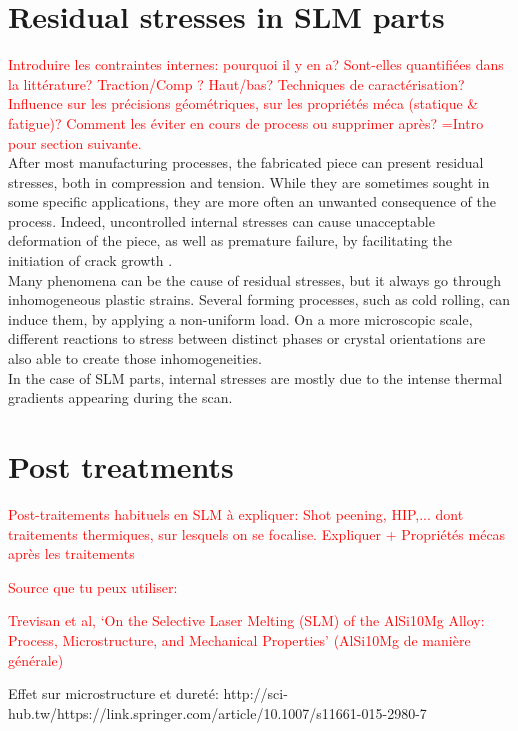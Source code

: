 \section{Residual stresses in SLM parts}
\textcolor{red}{Introduire les contraintes internes: pourquoi il y en a? Sont-elles quantifiées dans la littérature? Traction/Comp ? Haut/bas? Techniques de caractérisation? Influence sur les précisions géométriques, sur les propriétés méca (statique \& fatigue)? Comment les éviter en cours de process ou supprimer après? =Intro pour section suivante.}\\

After most manufacturing processes, the fabricated piece can present residual stresses, both in compression and tension. While they are sometimes sought in some specific applications, they are more often an unwanted consequence of the process. Indeed, uncontrolled internal stresses can cause unacceptable deformation of the piece, as well as premature failure, by facilitating the initiation of crack growth \cite{Vrancken2016}.\\

Many phenomena can be the cause of residual stresses, but it always go through inhomogeneous plastic strains. Several forming processes, such as cold rolling, can induce them, by applying a non-uniform load. On a more microscopic scale, different reactions to stress between distinct phases or crystal orientations are also able to create those inhomogeneities.\\

In the case of SLM parts, internal stresses are mostly due to the intense thermal gradients appearing during the scan.

\cite{Salmi2017}

\section{Post treatments}
\textcolor{red}{Post-traitements habituels en SLM à expliquer: Shot peening, HIP,... dont traitements thermiques, sur lesquels on se focalise. Expliquer + Propriétés mécas après les traitements}

\textcolor{red}{Source que tu peux utiliser:}

\textcolor{red}{Trevisan et al, ‘On the Selective Laser Melting (SLM) of the AlSi10Mg Alloy: Process, Microstructure, and Mechanical Properties’ (AlSi10Mg de manière générale)}

Effet sur microstructure et dureté:
http://sci-hub.tw/https://link.springer.com/article/10.1007/s11661-015-2980-7

